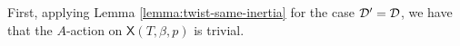 First, applying Lemma \ref{lemma:twist-same-inertia} for the case $\mathcal{D}' = \mathcal{D}$, we have that the $A$-action on $\mathsf{X}(T, \beta, p)$ is trivial.


